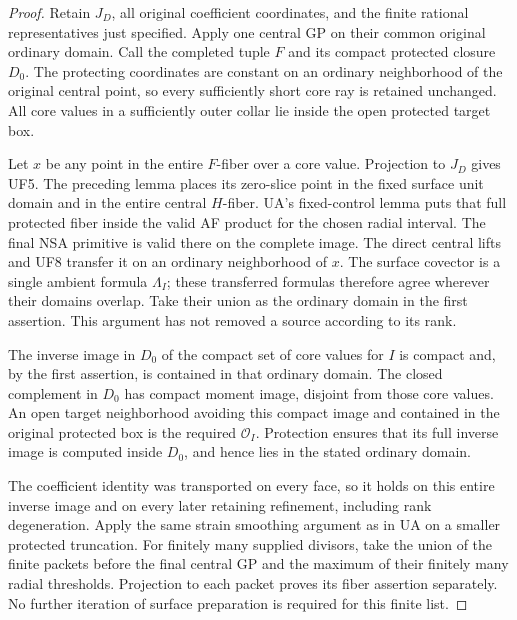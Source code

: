 \begin{proof}
Retain \(J_D\), all original coefficient
coordinates, and the finite rational
representatives just specified.  Apply one
central GP on their common original ordinary
domain.  Call the completed tuple \(F\)
and its compact protected closure \(D_0\).
The protecting coordinates are constant on
an ordinary neighborhood of the original
central point, so every sufficiently short
core ray is retained unchanged.  All core
values in a sufficiently outer collar lie
inside the open protected target box.

Let \(x\) be any point in the entire
\(F\)-fiber over a core value.  Projection
to \(J_D\) gives UF5.  The preceding lemma
places its zero-slice point in the fixed
surface unit domain and in the entire
central \(H\)-fiber.  UA's fixed-control
lemma puts that full protected fiber inside
the valid AF product for the chosen radial
interval.  The final NSA primitive is valid
there on the complete image.  The direct
central lifts and UF8 transfer it on an
ordinary neighborhood of \(x\).  The
surface covector is a single ambient
formula \(\Lambda_I\); these transferred
formulas therefore agree wherever their
domains overlap.  Take their union as the
ordinary domain in the first assertion.
This argument has not removed a source
according to its rank.

The inverse image in \(D_0\) of the
compact set of core values for \(I\)
is compact and, by the first assertion,
is contained in that ordinary domain.
The closed complement in \(D_0\) has
compact moment image, disjoint from those
core values.  An open target neighborhood
avoiding this compact image and contained
in the original protected box is the
required \(\mathcal O_I\).  Protection
ensures that its full inverse image is
computed inside \(D_0\), and hence lies
in the stated ordinary domain.

The coefficient identity was transported
on every face, so it holds on this entire
inverse image and on every later retaining
refinement, including rank degeneration.
Apply the same strain smoothing argument
as in UA on a smaller protected truncation.
For finitely many supplied divisors, take
the union of the finite packets before
the final central GP and the maximum of
their finitely many radial thresholds.
Projection to each packet proves its
fiber assertion separately.  No further
iteration of surface preparation is
required for this finite list.
\end{proof}

